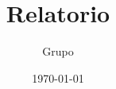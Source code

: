 \documentclass[a4paper, 12pt]{article}
\title{Relatorio }
\author{Grupo}
\date{\today}
\begin{document}







\tableofcontents


\listoffigures











{}


\end{document}
